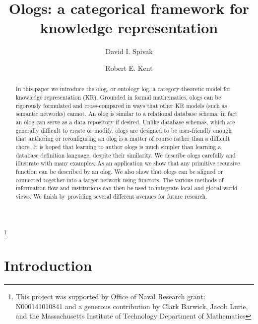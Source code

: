 \documentclass{amsart}
\theoremstyle{remark}
\theoremstyle{definition}
\begin{document}
\title{Ologs: a categorical framework for knowledge representation}
\author{David I. Spivak}
\address{Mathematics, MIT, Cambridge, MA 02139}

\author{Robert E. Kent}
\address{Ontologos}

\thanks{This project was supported by Office of Naval Research grant: N000141010841 and a generous contribution by Clark Barwick, Jacob Lurie, and the Massachusetts Institute of Technology Department of Mathematics}

\begin{abstract}
In this paper we introduce the olog, or ontology log, 
a category-theoretic model for knowledge representation (KR). 
Grounded in formal mathematics, 
ologs can be rigorously formulated and cross-compared in ways that other KR models (such as semantic networks) cannot. 
An olog is similar to a relational database schema; 
in fact an olog can serve as a data repository if desired. 
Unlike database schemas, which are generally difficult to create or modify, 
ologs are designed to be user-friendly enough 
that authoring or reconfiguring an olog is a matter of course rather than a difficult chore. 
It is hoped that learning to author ologs is much simpler than learning a database definition language, 
despite their similarity. 
We describe ologs carefully and illustrate with many examples. 
As an application we show that any primitive recursive function can be described by an olog. 
We also show that ologs can be aligned or connected together into a larger network using functors. 
The various methods of information flow and institutions can then be used to integrate local and global world-views. 
We finish by providing several different avenues for future research.
\end{abstract}

\maketitle
\tableofcontents
\raggedbottom


\section{Introduction}\label{sec:intro}
\end{document}
